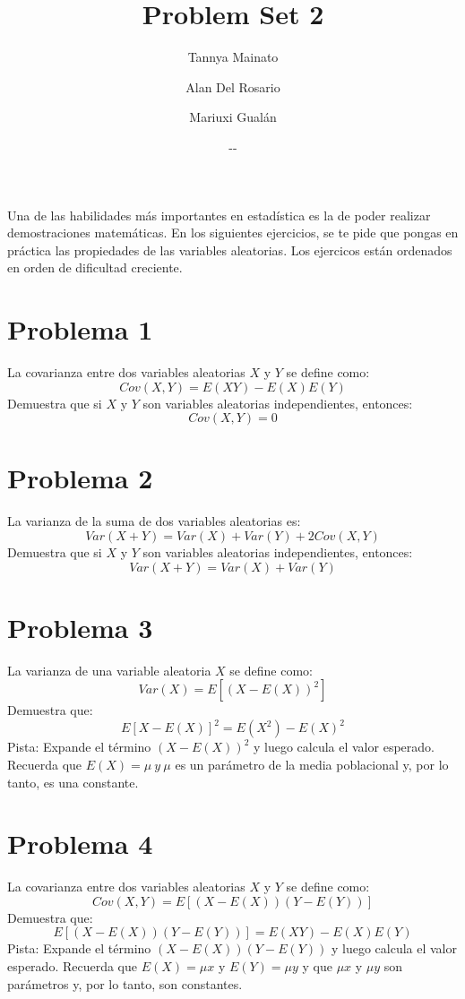 \documentclass[]{article}
\title{Problem Set 2}
\author{Tannya Mainato \and Alan Del Rosario \and Mariuxi Gualán}
\date{\the\year-\twodigit\month-\twodigit\day}
\begin{document}
 
\maketitle

Una de las habilidades más importantes en estadística es la de poder realizar demostraciones matemáticas. En los siguientes ejercicios, se te pide que pongas en práctica las propiedades de las variables aleatorias. Los ejercicos están ordenados en orden de dificultad creciente. 

\section*{Problema 1}

La covarianza entre dos variables aleatorias $X$ y $Y$ se define como: 
$$Cov(X,Y)=E(XY)-E(X)E(Y)$$
Demuestra que si $X$ y $Y$ son variables aleatorias independientes, entonces: 
$$Cov(X,Y)=0$$

\section*{Problema 2}

La varianza de la suma de dos variables aleatorias es: 
$$Var(X+Y)=Var(X)+Var(Y)+2Cov(X,Y)$$
Demuestra que si $X$ y $Y$ son variables aleatorias independientes, entonces: 
$$Var(X+Y)=Var(X)+Var(Y)$$

\section*{Problema 3}

La varianza de una variable aleatoria $X$ se define como: 
$$Var(X)=E[(X-E(X))^2]$$
Demuestra que: 
$$E[X-E(X)]^2=E(X^2)-E(X)^2$$
Pista: Expande el término $(X-E(X))^2$ y luego calcula el valor esperado. Recuerda que $E(X)=\mu \ y \ \mu$ es un parámetro de la media poblacional y, por lo tanto, es una constante. 

\section*{Problema 4}

La covarianza entre dos variables aleatorias $X$ y $Y$ se define como:
$$Cov(X,Y)=E[(X-E(X))(Y-E(Y))]$$
Demuestra que: 
$$E[(X-E(X))(Y-E(Y))]=E(XY)-E(X)E(Y)$$
Pista: Expande el término $(X-E(X))(Y-E(Y))$ y luego calcula el valor esperado. Recuerda que $E(X)=\mu x$ y $E(Y)=\mu y$ y que $\mu x$ y $\mu y$ son parámetros y, por lo tanto, son constantes.
\end{document}
